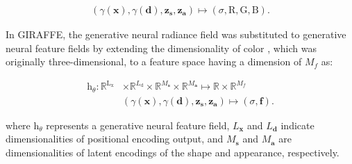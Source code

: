 \documentclass[nohyperref]{article}
\theoremstyle{plain}
\theoremstyle{definition}
\theoremstyle{remark}
\begin{document}
\begin{align}
    (\gamma(\textbf{x}), \gamma(\textbf{d}), \textbf{z}_{\textbf{s}}, \textbf{z}_{\textbf{a}})\mapsto (\sigma, \text{R}, \text{G}, \text{B}).
\end{align}

In GIRAFFE, the generative neural radiance field was substituted to generative neural feature fields by extending the dimensionality of color \cite{niemeyer2021giraffe}, which was originally three-dimensional, to a feature space having a dimension of $M_{f}$ as:



\begin{align}
    \text{h}_{\theta}: \mathbb{R}^{\text{L}_{\text{x}}}& \times \mathbb{R}^{L_{\text{d}}} \times \mathbb{R}^{M_{\textbf{s}}} \times \mathbb{R}^{M_{\textbf{a}}} \mapsto \mathbb{R} \times \mathbb{R}^{M_{f}}
    \\ \nonumber &(\gamma(\textbf{x}), \gamma(\textbf{d}), \textbf{z}_{\textbf{s}}, \textbf{z}_{\textbf{a}})\mapsto (\sigma, \textbf{f}).
\end{align}

where $\text{h}_{\theta}$ represents a generative neural feature field, $L_{\textbf{x}}$ and $L_{\textbf{d}}$ indicate dimensionalities of positional encoding output, and $M_{\textbf{s}}$ and $M_{\textbf{a}}$ are dimensionalities of latent encodings of the shape and appearance, respectively.
\end{document}
